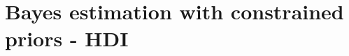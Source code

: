 \renewcommand\chaptername{Appendix}
\chapter{Bayes estimation with constrained priors - HDI}
\label{apd:bayes_hdi}





\begin{landscape}

\end{landscape}


\vspace{-2em}


